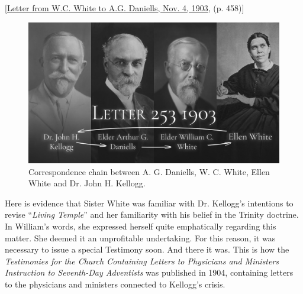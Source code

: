 


[\href{https://ellenwhite.org/letterbooks/555}{Letter from W.C. White to A.G. Daniells, Nov. 4, 1903,} (p. 458)]

\begin{figure}[h]
    \centering
    \includegraphics[width=1\linewidth]{images/correspondance.jpg}
    \caption*{Correspondence chain between A. G. Daniells, W. C. White, Ellen White and Dr. John H. Kellogg.}
    \label{fig:corespondance}
\end{figure}

Here is evidence that Sister White was familiar with Dr. Kellogg's intentions to revise “\textit{Living Temple}” and her familiarity with his belief in the Trinity doctrine. In William's words, she expressed herself quite emphatically regarding this matter. She deemed it an unprofitable undertaking. For this reason, it was necessary to issue a special Testimony soon. And there it was. This is how the \textit{Testimonies for the Church Containing Letters to Physicians and Ministers Instruction to Seventh-Day Adventists} was published in 1904, containing letters to the physicians and ministers connected to Kellogg's crisis.  

